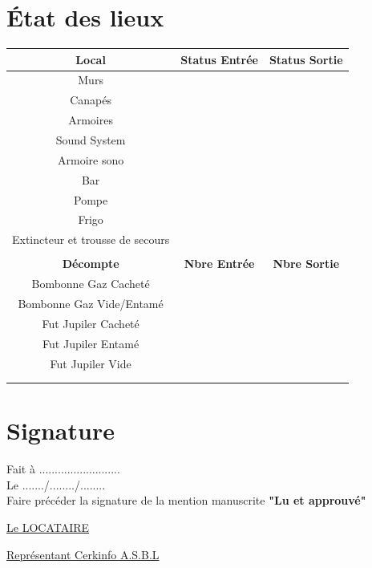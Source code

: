 \documentclass{article}
\begin{document}
\section*{État des lieux}
\begin{center}
\end{center}
\begin{center}
\begin{tabular}{ |c|c|c| } 
 \hline
 \textbf{Local} & \textbf{Status Entrée} & \textbf{Status Sortie} \\
 \hline
 Murs &  &  \\
 \hline
 Canapés &  &  \\
 \hline
 Armoires &  &  \\
 \hline
 Sound System &  &  \\
 \hline
 Armoire sono & & \\
 \hline
 Bar &  &  \\
 \hline
 Pompe &  &  \\
 \hline
 Frigo &  &  \\
 \hline
 Extincteur et trousse de secours &  &  \\
 \hline
  &  &  \\ 
 \hline
 \textbf{Décompte} & \textbf{Nbre Entrée} & \textbf{Nbre Sortie} \\
 \hline
 Bombonne Gaz Cacheté &  &  \\
 \hline
 Bombonne Gaz Vide/Entamé &  &  \\
 \hline
 Fut Jupiler Cacheté &  &  \\
 \hline
 Fut Jupiler Entamé &  &  \\
 \hline
 Fut Jupiler Vide &  &  \\
 \hline
  &  &  \\
 \hline
  &  &  \\
 \hline
\end{tabular}
\end{center}

\section*{Signature}
Fait à .......................... \\
Le ......./......../........ \\
Faire précéder la signature de la mention manuscrite \textbf{"Lu et approuvé"}\\

\begin{minipage}{0.5\textwidth}
\underline{Le LOCATAIRE}
\end{minipage}
\begin{minipage}{0.5\textwidth}\raggedleft
\underline{Représentant Cerkinfo A.S.B.L}
\end{minipage}
\end{document}

